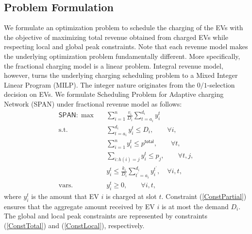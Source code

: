 \documentclass[journal]{IEEEtran}
\newcommand{\rev}[1]{{\color{black}#1}}%
\newcommand{\rev}[1]{#1}
\newcommand{\MCSP}{\textsf{SPAN}\xspace}
\newcommand{\bee}{\begin{eqnarray}}
\newcommand{\eee}{\end{eqnarray}}
\newcommand{\bse}{\begin{subequations}}
\newcommand{\ese}{\end{subequations}}
\begin{document}
		\subsection{Problem Formulation}
		\label{sec:problem}
	We formulate an optimization problem to schedule the charging of the EVs with the objective of maximizing total revenue obtained from charged EVs while respecting local and global peak constraints. 
		Note that each revenue model makes the underlying optimization problem fundamentally different. More specifically, the fractional charging model is a linear problem. 
		Integral revenue model, however, turns the underlying charging scheduling problem to a Mixed Integer Linear Program (MILP). The integer nature originates from the $0/1$-selection decision on EVs. 
		We formulate Scheduling Problem for Adaptive charging Network (\MCSP) under fractional revenue model as follows: 
		\bse
		\bee
		\MCSP: \max  && \sum\nolimits_{i=1}^n \frac{v_{i}}{D_i}\sum\nolimits_{t=a_i}^{d_i} y_i^t \label{Pobjec} \nonumber\\
		\text{s.t.} &&\sum\nolimits_{t=a_i}^{d_i} y_i^t\leq D_i,\quad\quad\forall i, \label{ConstPartial} \\
		&&  \sum\nolimits_{i=1}^n y_i^t\leq p^\mathsf{total} ,\quad\quad\forall t,\label{ConstTotal} \\
		&&\sum\nolimits_{i:h(i)=j} y_i^t\leq p_j ,\quad\quad\forall t,j,\label{ConstLocal}\\
		&& y_i^t  \leq \frac{k_i}{D_i}\sum\nolimits_{t^\prime=a_i}^{d_i} y_i^{t^\prime}, \quad\forall i,t,\label{ConstSpeed}\\
		\text{vars.} && y_i^t \geq 0, \quad\quad\forall i, t,\label{ConstPositive}\nonumber
		\eee
		\ese
		where $y_i^t$ is the amount that EV $i$ is charged at slot $t$. Constraint (\ref{ConstPartial}) ensures that the aggregate amount received by EV $i$ is at most the demand $D_i$. 
The global and local peak constraints are represented by constraints (\ref{ConstTotal}) and (\ref{ConstLocal}), respectively. 
		
\end{document}
